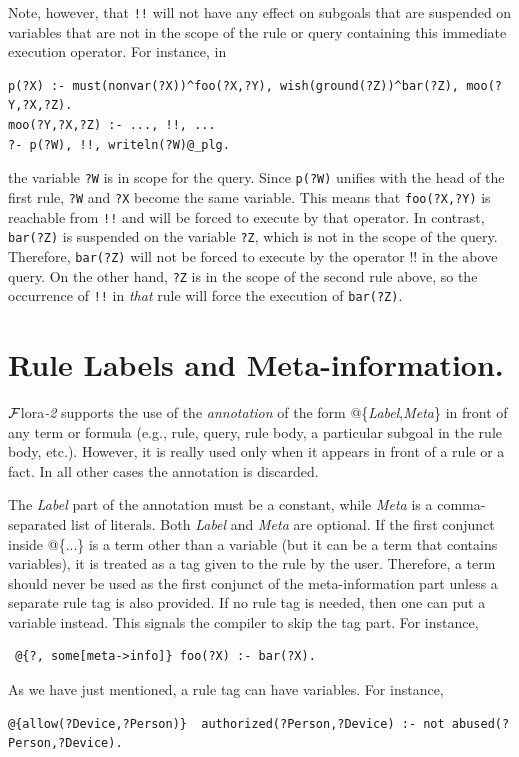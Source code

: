 \documentclass[11pt]{article}
\newcommand{\FLORA}{{\mbox{\sc ${\cal F}${lora}\rm\emph{-2}}}\xspace}
\begin{document}
Note, however, that \texttt{!!} will not have any effect on subgoals that
are suspended on variables that are not in the scope of the rule or query
containing this
immediate execution operator. For instance, in
\begin{verbatim}
p(?X) :- must(nonvar(?X))^foo(?X,?Y), wish(ground(?Z))^bar(?Z), moo(?Y,?X,?Z).
moo(?Y,?X,?Z) :- ..., !!, ...
?- p(?W), !!, writeln(?W)@_plg.
\end{verbatim}
the variable \texttt{?W} is in scope for the query. Since
\texttt{p(?W)} unifies with the head of the first rule, \texttt{?W} and
\texttt{?X} become the same variable. This means that \texttt{foo(?X,?Y)}
is reachable from \texttt{!!} and will be forced to execute by that operator.
In contrast, \texttt{bar(?Z)} is suspended on the variable \texttt{?Z},
which is not in the scope of the query. Therefore, \texttt{bar(?Z)} will
not be forced to execute by the operator !! in the above query.   
On the other hand, \texttt{?Z} is in the scope of the second rule above, so
the occurrence of \texttt{!!} in \emph{that} rule will force the execution of
\texttt{bar(?Z)}.   


\section{Rule Labels and Meta-information.}
\label{sec-rule-label}

\FLORA supports the use of the \emph{annotation} of the form
@\{\emph{Label},\emph{Meta}\} in front of any term or formula (e.g., rule,
query, rule body, a particular subgoal in the rule body, etc.). However,
it is really used only when it appears in front of a rule or a fact.
In all other cases the annotation is discarded.

The \emph{Label} part of the annotation
must be a constant, while \emph{Meta} is a comma-separated list of literals.
Both \emph{Label} and \emph{Meta} are optional. If the first conjunct
inside @\{...\} is a term other than a variable (but it can be a term that
contains variables), it is treated as a tag given
to the rule by the user. Therefore, a
term should never be used as the first conjunct of the
meta-information part unless a separate rule tag is also provided.
If no rule tag is needed, then one can put a variable instead. This
signals the compiler to skip the tag part. For instance,
\begin{verbatim}
 @{?, some[meta->info]} foo(?X) :- bar(?X).
\end{verbatim}
As we have just mentioned, a rule tag can have variables. For instance,
\begin{verbatim}
@{allow(?Device,?Person)}  authorized(?Person,?Device) :- not abused(?Person,?Device).
\end{verbatim}
\end{document}
